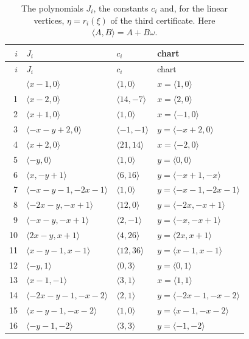 \documentclass[11pt]{article}
\begin{document}
\begingroup\small
\setlength{\LTcapwidth}{\textwidth}
\begin{longtable}{@{}rlll@{}}
\caption{The polynomials $J_i$, the constants $c_i$ and, for the linear vertices, $\eta=r_i(\xi)$ of the third certificate. Here $\langle A,B\rangle=A+B\omega$.}\label{tab:cvert3}\\
\hline $i$ & $J_i$ & $c_i$ & chart\\\hline\endfirsthead\hline $i$ & $J_i$ & $c_i$ & chart\\\hline\endhead\hline\endfoot
0 & $\langle x-1,0\rangle$ & $\langle 1,0\rangle$ & $x=\langle 1,0\rangle$\\
1 & $\langle x-2,0\rangle$ & $\langle 14,-7\rangle$ & $x=\langle 2,0\rangle$\\
2 & $\langle x+1,0\rangle$ & $\langle 1,0\rangle$ & $x=\langle -1,0\rangle$\\
3 & $\langle -x-y+2,0\rangle$ & $\langle -1,-1\rangle$ & $y=\langle -x+2,0\rangle$\\
4 & $\langle x+2,0\rangle$ & $\langle 21,14\rangle$ & $x=\langle -2,0\rangle$\\
5 & $\langle -y,0\rangle$ & $\langle 1,0\rangle$ & $y=\langle 0,0\rangle$\\
6 & $\langle x,-y+1\rangle$ & $\langle 6,16\rangle$ & $y=\langle -x+1,-x\rangle$\\
7 & $\langle -x-y-1,-2x-1\rangle$ & $\langle 1,0\rangle$ & $y=\langle -x-1,-2x-1\rangle$\\
8 & $\langle -2x-y,-x+1\rangle$ & $\langle 12,0\rangle$ & $y=\langle -2x,-x+1\rangle$\\
9 & $\langle -x-y,-x+1\rangle$ & $\langle 2,-1\rangle$ & $y=\langle -x,-x+1\rangle$\\
10 & $\langle 2x-y,x+1\rangle$ & $\langle 4,26\rangle$ & $y=\langle 2x,x+1\rangle$\\
11 & $\langle x-y-1,x-1\rangle$ & $\langle 12,36\rangle$ & $y=\langle x-1,x-1\rangle$\\
12 & $\langle -y,1\rangle$ & $\langle 0,3\rangle$ & $y=\langle 0,1\rangle$\\
13 & $\langle x-1,-1\rangle$ & $\langle 3,1\rangle$ & $x=\langle 1,1\rangle$\\
14 & $\langle -2x-y-1,-x-2\rangle$ & $\langle 2,1\rangle$ & $y=\langle -2x-1,-x-2\rangle$\\
15 & $\langle x-y-1,-x-2\rangle$ & $\langle 1,0\rangle$ & $y=\langle x-1,-x-2\rangle$\\
16 & $\langle -y-1,-2\rangle$ & $\langle 3,3\rangle$ & $y=\langle -1,-2\rangle$\\

\end{longtable}
\end{document}
